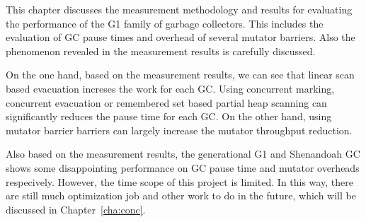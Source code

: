 This chapter discusses the measurement methodology and results for evaluating the
performance of the G1 family of garbage collectors. This includes the evaluation of
GC pause times and overhead of several mutator barriers. Also the phenomenon revealed
in the measurement results is carefully discussed.

On the one hand, based on the measurement results, we can see that linear scan based evacuation
increses the work for each GC. Using concurrent marking, concurrent evacuation
or remembered set based partial heap scanning can significantly reduces the pause time
for each GC. On the other hand, using mutator barrier barriers can largely increase the
mutator throughput reduction.

Also based on the measurement results, the generational G1 and Shenandoah GC shows some
disappointing performance on GC pause time and mutator overheads respecively.
However, the time scope of this project is limited.
In this way, there are still much optimization job and other work to do in the future,
which will be discussed in Chapter~\ref{cha:conc}.







%   

%       

%       

